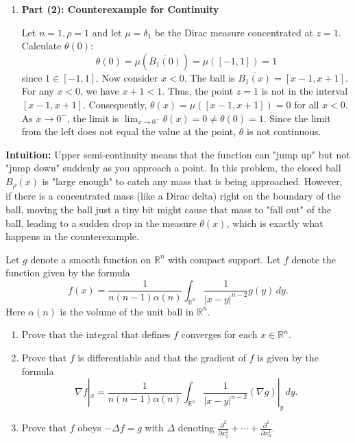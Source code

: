 \begin{solution}
\begin{enumerate}
    By Fatou's Lemma (applied to the sequence of functions $1 - \chi$ or using a generalized version for limsup of bounded functions on finite measure sets, or simply noting $\chi \leq 1$):
    \[
    \limsup_{k\to\infty} \int \chi_{\overline{B_\rho(x_k)}} \, d\mu \leq \int \limsup_{k\to\infty} \chi_{\overline{B_\rho(x_k)}} \, d\mu \leq \int \chi_{\overline{B_\rho(x)}} \, d\mu = \theta(x)
    \]
    Thus, $\theta$ is upper semi-continuous.

    \item \textbf{Part (2): Counterexample for Continuity}

    Let $n=1, \rho=1$ and let $\mu = \delta_1$ be the Dirac measure concentrated at $z=1$.
    Calculate $\theta(0)$:
    \[
    \theta(0) = \mu(\overline{B_1(0)}) = \mu([-1, 1]) = 1
    \]
    since $1 \in [-1, 1]$.
    Now consider $x < 0$. The ball is $\overline{B_1(x)} = [x-1, x+1]$. 
    For any $x < 0$, we have $x+1 < 1$. Thus, the point $z=1$ is not in the interval $[x-1, x+1]$.
    Consequently, $\theta(x) = \mu([x-1, x+1]) = 0$ for all $x < 0$.
    As $x \to 0^-$, the limit is $\lim_{x\to 0^-} \theta(x) = 0 \neq \theta(0) = 1$.
    Since the limit from the left does not equal the value at the point, $\theta$ is not continuous.
\end{enumerate}

\par\vspace{\baselineskip}
\textbf{Intuition:} 
Upper semi-continuity means that the function can "jump up" but not "jump down" suddenly as you approach a point. In this problem, the closed ball $\overline{B_\rho(x)}$ is "large enough" to catch any mass that is being approached. However, if there is a concentrated mass (like a Dirac delta) right on the boundary of the ball, moving the ball just a tiny bit might cause that mass to "fall out" of the ball, leading to a sudden drop in the measure $\theta(x)$, which is exactly what happens in the counterexample.
\end{solution}

\begin{exercise}
\label{analysis:2018:5}
Let $g$ denote a smooth function on $\mathbb{R}^n$ with compact support. Let $f$ denote the function given by the formula
\[
f(x) = \frac{1}{n(n-1)\alpha(n)} \int_{\mathbb{R}^n} \frac{1}{|x-y|^{n-2}} g(y) \, dy.
\]
Here $\alpha(n)$ is the volume of the unit ball in $\mathbb{R}^n$.
\begin{enumerate}
    \item Prove that the integral that defines $f$ converges for each $x \in \mathbb{R}^n$.
    \item Prove that $f$ is differentiable and that the gradient of $f$ is given by the formula
    \[
    \nabla f|_x = \frac{1}{n(n-1)\alpha(n)} \int_{\mathbb{R}^n} \frac{1}{|x-y|^{n-2}} (\nabla g)|_y \, dy.
    \]
    \item Prove that $f$ obeys $-\Delta f = g$ with $\Delta$ denoting $\frac{\partial^2}{\partial x_1^2} + \cdots + \frac{\partial^2}{\partial x_n^2}$.
\end{enumerate}
\end{exercise}

